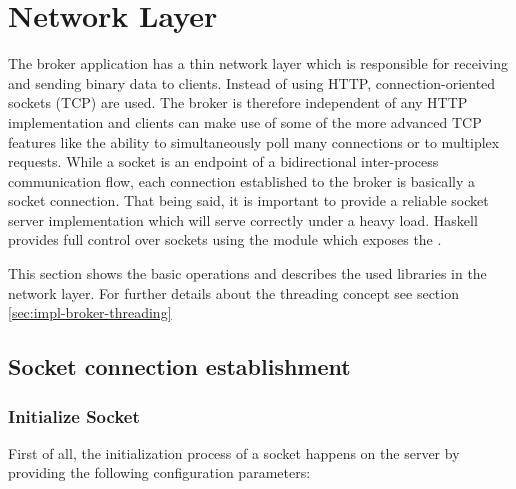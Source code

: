 \newpage
\section{Network Layer}
\label{sec:broker-network}

The broker application has a thin network layer which is responsible for
receiving and sending binary data to clients. Instead of using HTTP, 
connection-oriented sockets (TCP) are used. The broker is therefore independent
of any HTTP implementation and clients can make use of some of the more advanced
TCP features like the ability to simultaneously poll many connections or to
multiplex requests. While a socket is an endpoint of a bidirectional
inter-process communication flow, each connection established to the broker is
basically a socket connection. That being said, it is important to provide a
reliable socket server implementation which will serve correctly under a heavy
load. Haskell provides full control over sockets using the
module which exposes the .

This section shows the basic operations and describes the used libraries in the
network layer. For further details about the threading concept see section
\ref{sec:impl-broker-threading} 

\subsection{Socket connection establishment}
\label{sec:impl-broker-socket-connection}


\subsubsection{Initialize Socket}

First of all, the initialization process of a socket happens on the server by providing the following configuration parameters:

